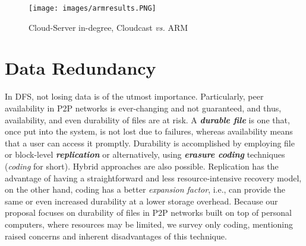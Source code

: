 \documentclass[runningheads]{llncs}
\begin{document}
\begin{figure}[!ht]
\centering
\texttt{[image: images/armresults.PNG]}
\caption{Cloud-Server in-degree, Cloudcast \textit{vs.} ARM}
\label{fig:arm_results}
\end{figure}

\newpage\section{Data Redundancy}\label{sec:dataredundancy}
In DFS, not losing data is of the utmost importance. Particularly, peer availability in P2P networks is ever-changing and not guaranteed, and thus, availability, and even durability of files are at risk. A \textbf{\textit{durable file}} is one that, once put into the system, is not lost due to failures, whereas availability means that a user can access it promptly. Durability is accomplished by employing file or block-level \textbf{\textit{replication}} or alternatively, using \textbf{\textit{erasure coding}} techniques (\textit{coding} for short). Hybrid approaches are also possible. Replication has the advantage of having a straightforward and less resource-intensive recovery model, on the other hand, coding has a better \textit{expansion factor}, i.e., can provide the same or even increased durability at a lower storage overhead. Because our proposal focuses on durability of files in P2P networks built on top of personal computers, where resources may be limited, we survey only coding, mentioning raised concerns and inherent disadvantages of this technique.
\end{document}
